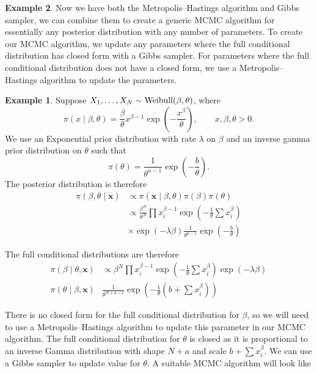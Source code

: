 \documentclass[
]{book}
\theoremstyle{definition}
\theoremstyle{definition}
\newtheorem{example}{Example}[chapter]
\theoremstyle{definition}
\theoremstyle{definition}
\theoremstyle{remark}
\begin{document}
\begin{example}
Now we have both the Metropolis--Hastings algorithm and Gibbs sampler, we can combine them to create a generic MCMC algorithm for essentially any posterior distribution with any number of parameters. To create our MCMC algorithm, we update any parameters where the full conditional distribution has closed form with a Gibbs sampler. For parameters where the full conditional distribution does not have a closed form, we use a Metropolis--Hastings algorithm to update the parameters.

\begin{example}
Suppose \(X_1, \ldots, X_N \sim \hbox{Weibull}(\beta, \theta)\), where
\[
\pi(x \mid\beta,\theta) = \frac{\beta}{\theta}x^{\beta - 1}\exp\left(-\frac{x^\beta}{\theta}\right), \qquad x, \beta, \theta > 0. 
\]
We use an Exponential prior distribution with rate \(\lambda\) on \(\beta\) and an inverse gamma prior distribution on \(\theta\) such that
\[
\pi(\theta) = \frac{1}{\theta^{a - 1}}\exp\left(-\frac{b}{\theta}\right).
\]
The posterior distribution is therefore
\begin{align*}
\pi(\beta, \theta \mid \boldsymbol{x}) &\propto \pi(\boldsymbol{x} \mid \beta, \theta)\pi(\beta)\pi(\theta) \\
&\propto \frac{\beta^N}{\theta^N}\prod x_i^{\beta - 1}\exp\left(-\frac{1}{\theta}\sum x_i^\beta\right)
\\
&\times\exp(-\lambda\beta) \frac{1}{\theta^{a - 1}}\exp\left(-\frac{b}{\theta}\right)
\end{align*}

The full conditional distributions are therefore
\begin{align*}
\pi(\beta \mid \theta, \boldsymbol{x}) &\propto\beta^N\prod x_i^{\beta - 1}\exp\left(-\frac{1}{\theta}\sum x_i^\beta\right)\exp(-\lambda\beta) \\
\pi(\theta \mid \beta, \boldsymbol{x}) & \frac{1}{\theta^{N + a -1}}\exp\left(-\frac{1}{\theta}(b + \sum x_i^\beta)\right)
\end{align*}

There is no closed form for the full conditional distribution for \(\beta\), so we will need to use a Metropolis--Hastings algorithm to update this parameter in our MCMC algorithm. The full conditional distribution for \(\theta\) is closed as it is proportional to an inverse Gamma distribution with shape \(N + a\) and scale \(b + \sum x_i^\beta\). We can use a Gibbs sampler to update value for \(\theta\). A suitable MCMC algorithm will look like


\end{example}
\end{example}
\end{document}
